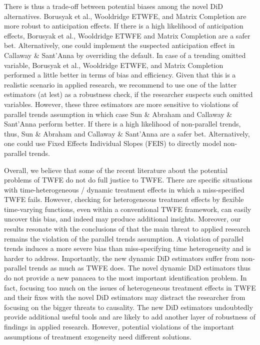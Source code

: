 There is thus a trade-off between potential biases among the novel DiD alternatives. Borusyak et al., Wooldridge ETWFE, and Matrix Completion are more robust to anticipation effects. If there is a high likelihood of anticipation effects, Borusyak et al., Wooldridge ETWFE and Matrix Completion are a safer bet. Alternatively, one could implement the suspected anticipation effect in Callaway \& Sant'Anna by overriding the default. In case of a trending omitted variable, Borusyak et al., Wooldridge ETWFE, and Matrix Completion performed a little better in terms of bias and efficiency. Given that this is a realistic scenario in applied research, we recommend to use one of the latter estimators (at lest) as a robustness check, if the researcher suspects such omitted variables. However, these three estimators are more sensitive to violations of parallel trends assumption in which case Sun \& Abraham and Callaway \& Sant'Anna perform better. If there is a high likelihood of non-parallel trends, thus, Sun \& Abraham and Callaway \& Sant'Anna are a safer bet. Alternatively, one could use Fixed Effects Individual Slopes (FEIS) to directly model non-parallel trends. 

Overall, we believe that some of the recent literature about the potential problems of TWFE do not do full justice to TWFE. There are specific situations with time-heterogeneous / dynamic treatment effects in which a miss-specified TWFE fails. However, checking for heterogeneous treatment effects by flexible time-varying functions, even within a conventional TWFE framework, can easily uncover this bias, and indeed may produce additional insights. Moreover, our results resonate with the conclusions of \textcite{Chiu.2023} that the main threat to applied research remains the violation of the parallel trends assumption. A violation of parallel trends induces a more severe bias than miss-specifying time heterogeneity and is harder to address. Importantly, the new dynamic DiD estimators suffer from non-parallel trends as much as TWFE does. The novel dynamic DiD estimators thus do not provide a new panacea to the most important identification problem. In fact, focusing too much on the issues of heterogeneous treatment effects in TWFE and their fixes with the novel DiD estimators may distract the researcher from focusing on the bigger threats to causality. The new DiD estimators undoubtedly provide additional useful tools and are likely to add another layer of robustness of findings in applied research. However, potential violations of the important assumptions of treatment exogeneity need different solutions.

